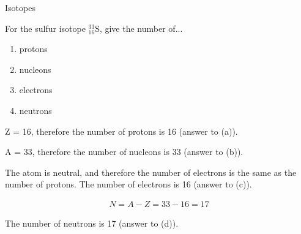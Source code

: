 \begin{wex}{Isotopes}
{
For the sulfur isotope $^{33}_{16}$S, give the number of...
	\begin{enumerate}
	\item{protons}
	\item{nucleons}
	\item{electrons}
	\item{neutrons}
	\end{enumerate}
}

{

Z = 16, therefore the number of protons is 16 (answer to (a)).\\
}

{

A = 33, therefore the number of nucleons is 33 (answer to (b)).\\
}

{

The atom is neutral, and therefore the number of electrons is the same as the number of protons. The number of electrons is 16 (answer to (c)).\\
}

{
\begin{eqnarray*}
N = A - Z
= 33 - 16
= 17
\end{eqnarray*}

The number of neutrons is 17 (answer to (d)).
}
\end{wex}

